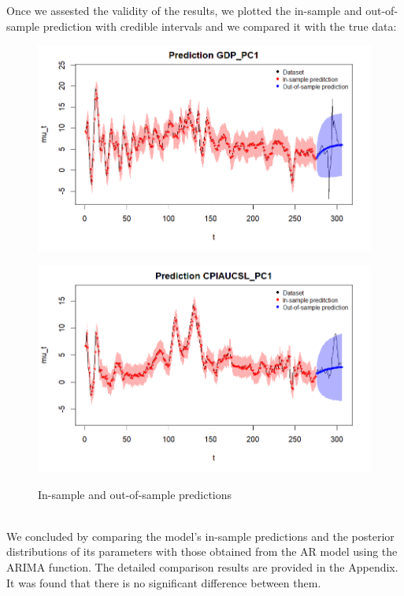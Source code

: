Once we assested the validity of the results, we plotted the in-sample and out-of-sample prediction with credible intervals and we compared it with the true data: \\
\begin{figure}[h]
    \centering
    \begin{minipage}[t]{0.7\textwidth}
        \centering
        \includegraphics[width=\textwidth]{../Images/2-AR/gdp_prediction.png}
        \label{fig:first}
    \end{minipage}
    \begin{minipage}[t]{0.7\textwidth}
        \centering
        \includegraphics[width=\textwidth]{../Images/2-AR/infl_prediction.png}
        \label{fig:second}
    \end{minipage}
    \caption{In-sample and out-of-sample predictions}
    \label{fig:combined}
\end{figure} \\

We concluded by comparing the model's in-sample predictions and the posterior distributions of its parameters with those obtained from the AR model using the ARIMA function. The detailed comparison results are provided in the Appendix. It was found that there is no significant difference between them. 